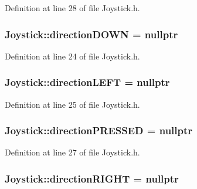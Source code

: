 Definition at line 28 of file Joystick.\+h.

\subsubsection[{\texorpdfstring{direction\+D\+O\+WN}{directionDOWN}}]{ Joystick\+::direction\+D\+O\+WN = nullptr}\hypertarget{class_joystick_aca32b8875e35bd9af63065e0d5dfafb9}{}\label{class_joystick_aca32b8875e35bd9af63065e0d5dfafb9}


Definition at line 24 of file Joystick.\+h.

\subsubsection[{\texorpdfstring{direction\+L\+E\+FT}{directionLEFT}}]{ Joystick\+::direction\+L\+E\+FT = nullptr}\hypertarget{class_joystick_a0a7fa96faefa92d2f2e09251b460b5ed}{}\label{class_joystick_a0a7fa96faefa92d2f2e09251b460b5ed}


Definition at line 25 of file Joystick.\+h.

\subsubsection[{\texorpdfstring{direction\+P\+R\+E\+S\+S\+ED}{directionPRESSED}}]{ Joystick\+::direction\+P\+R\+E\+S\+S\+ED = nullptr}\hypertarget{class_joystick_ab7b8181af7f4b77fe567c9fe2b00cf89}{}\label{class_joystick_ab7b8181af7f4b77fe567c9fe2b00cf89}


Definition at line 27 of file Joystick.\+h.

\subsubsection[{\texorpdfstring{direction\+R\+I\+G\+HT}{directionRIGHT}}]{ Joystick\+::direction\+R\+I\+G\+HT = nullptr}\hypertarget{class_joystick_a6fcd661de0e47977ebfddd1950004bd1}{}\label{class_joystick_a6fcd661de0e47977ebfddd1950004bd1}


